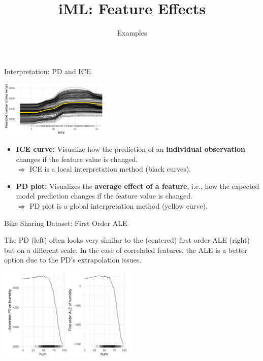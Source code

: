\documentclass[aspectratio=169]{../latex_main/tntbeamer}  %
\title[Introduction]{iML: Feature Effects}
\subtitle{Examples}
\begin{document}
	
	\maketitle


\begin{frame}[c]{Interpretation: PD and ICE}
\begin{center}
\includegraphics[width=0.4\textwidth]{figure/bike-sharing-dataset01.png}
\end{center}

\begin{itemize}
\item
  \textbf{ICE curve:} Visualize how the prediction of an
  \textbf{individual observation} changes if the feature value is
  changed.\\
  \(\Rightarrow\) ICE is a local interpretation method (black curves).
\item
  \textbf{PD plot:} Visualizes the \textbf{average effect of a feature},
  i.e., how the expected model prediction changes if the feature value is changed.\\
  \(\Rightarrow\) PD plot is a global interpretation method (yellow curve).
\end{itemize}
\end{frame}




\begin{frame}{Bike Sharing Dataset: First Order ALE}

The PD (left) often looks very similar to the (centered) first order ALE (right) but on a different scale. In the case of correlated features, the ALE is a better option due to the PD's extrapolation issues.


\begin{center}
\includegraphics[width=0.5\textwidth]{figure/first-order.png}
\end{center}


\end{frame}
\end{document}
